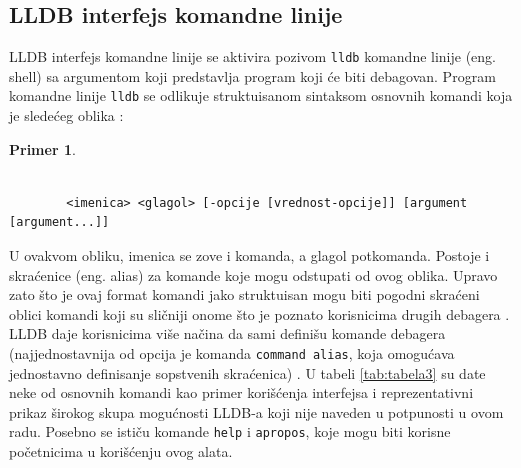\documentclass[a4paper]{article}
\newtheorem{primer}{Primer}[section]
\begin{document}
\subsection{LLDB interfejs komandne linije}
LLDB interfejs komandne linije se aktivira pozivom \verb|lldb| komandne linije (eng. shell) sa argumentom koji predstavlja program koji će biti debagovan. Program komandne linije \verb|lldb| se odlikuje struktuisanom sintaksom osnovnih komandi koja je sledećeg oblika \cite{lldb_tutorial}:
\begin{primer}
	\begin{footnotesize}
		\begin{verbatim}
		
		<imenica> <glagol> [-opcije [vrednost-opcije]] [argument [argument...]]
		\end{verbatim}
	\end{footnotesize}
\end{primer}
U ovakvom obliku, imenica se zove i komanda, a glagol potkomanda. Postoje i skraćenice (eng. alias) za komande koje mogu odstupati od ovog oblika. Upravo zato što je ovaj format komandi jako struktuisan mogu biti pogodni skraćeni oblici komandi koji su sličniji onome što je poznato korisnicima drugih debagera \cite{apple_lldb_comms}. LLDB daje korisnicima više načina da sami definišu komande debagera (najjednostavnija od opcija je komanda \verb|command alias|, koja omogućava jednostavno definisanje sopstvenih skraćenica) \cite{book}. U tabeli \ref{tab:tabela3} su date neke od osnovnih komandi kao primer korišćenja interfejsa i reprezentativni prikaz širokog skupa mogućnosti LLDB-a koji nije naveden u potpunosti u ovom radu. Posebno se ističu komande \verb|help| i \verb|apropos|, koje mogu biti korisne početnicima u korišćenju ovog alata.
\end{document}
